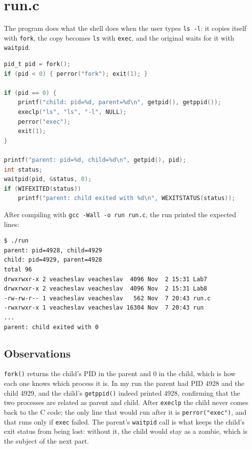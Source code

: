 \documentclass[12pt,a4paper]{article}
\begin{document}
\section{run.c}

The program does what the shell does when the user types \texttt{ls -l}: it copies itself with \texttt{fork}, the copy becomes \texttt{ls} with \texttt{exec}, and the original waits for it with \texttt{waitpid}.

\begin{lstlisting}[language=C]
pid_t pid = fork();
if (pid < 0) { perror("fork"); exit(1); }

if (pid == 0) {
    printf("child: pid=%d, parent=%d\n", getpid(), getppid());
    execlp("ls", "ls", "-l", NULL);
    perror("exec");
    exit(1);
}

printf("parent: pid=%d, child=%d\n", getpid(), pid);
int status;
waitpid(pid, &status, 0);
if (WIFEXITED(status))
    printf("parent: child exited with %d\n", WEXITSTATUS(status));
\end{lstlisting}

After compiling with \texttt{gcc -Wall -o run run.c}, the run printed the expected lines:

\begin{lstlisting}
$ ./run
parent: pid=4928, child=4929
child: pid=4929, parent=4928
total 96
drwxrwxr-x 2 veacheslav veacheslav  4096 Nov  2 15:31 Lab7
drwxrwxr-x 2 veacheslav veacheslav  4096 Nov  2 15:31 Lab8
-rw-rw-r-- 1 veacheslav veacheslav   562 Nov  7 20:43 run.c
-rwxrwxr-x 1 veacheslav veacheslav 16304 Nov  7 20:43 run
...
parent: child exited with 0
\end{lstlisting}

\subsection{Observations}

\texttt{fork()} returns the child's PID in the parent and 0 in the child, which is how each one knows which process it is. In my run the parent had PID 4928 and the child 4929, and the child's \texttt{getppid()} indeed printed 4928, confirming that the two processes are related as parent and child. After \texttt{execlp} the child never comes back to the C code; the only line that would run after it is \texttt{perror("exec")}, and that runs only if \texttt{exec} failed. The parent's \texttt{waitpid} call is what keeps the child's exit status from being lost: without it, the child would stay as a zombie, which is the subject of the next part.
\end{document}
